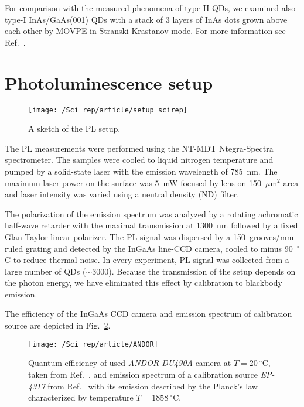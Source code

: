 For comparison with the measured phenomena of type-II QDs, we examined also type-I InAs/GaAs(001) QDs with a stack of 3 layers of InAs dots grown above each other by MOVPE in Stranski-Krastanov mode. For more information see Ref.~\citep{HumPhysE}.

\section{Photoluminescence setup}
%
\begin{figure}
	\centering
	\texttt{[image: /Sci\_rep/article/setup\_scirep]}
	\caption{A sketch of the PL setup.}
	\label{fig:}
\end{figure}
The PL measurements were performed using the NT-MDT Ntegra-Spectra spectrometer. The samples were cooled to liquid nitrogen temperature and pumped by a solid-state laser with the emission wavelength of 785~nm. The maximum laser power on the surface was 5~mW focused by lens on 150~$\mu\mathrm{m}^2$ area and laser intensity was varied using a neutral density (ND) filter. 

%
The polarization of the emission spectrum was analyzed by a rotating achromatic half-wave retarder with the maximal transmission at 1300~nm followed by a fixed Glan-Taylor linear polarizer. The PL signal was dispersed by a 150~grooves/mm ruled grating and detected by the InGaAs line-CCD camera, cooled to minus 90~$^\circ$C to reduce thermal noise. In every experiment, PL signal was collected from a large number of QDs ($\sim$3000). Because the transmission of the setup depends on the photon energy, we have eliminated this effect by calibration to blackbody emission. 


The efficiency of the InGaAs CCD camera and emission spectrum of calibration source are depicted in Fig.~\ref{fig:calib_scirep}.
\begin{figure}
	\centering
	\texttt{[image: /Sci\_rep/article/ANDOR]}
	\caption{Quantum efficiency of used \textit{ANDOR DU490A} camera at $T=20~^\circ$C, taken from Ref.~\citep{manual_andor}, and emission spectrum of a calibration source \textit{EP-4317} from Ref.~\citep{manual_BB} with its emission described by the Planck's law~\citep{Planck_law} characterized by temperature $T=1858~^\circ$C.}
	\label{fig:calib_scirep}
\end{figure}

